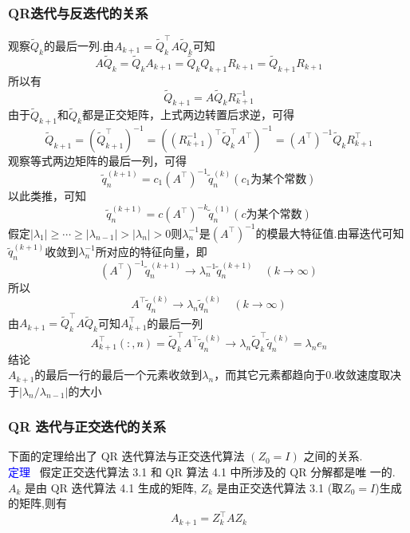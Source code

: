 \documentclass[12pt,a4paper]{article}
\begin{document}
	\subsubsection{QR迭代与反迭代的关系}
	观察$\tilde{Q}_{k}$的最后一列.由$A_{k+1}=\tilde{Q}_{k}^{\top} A \tilde{Q}_{k}$可知
	$$
	A \tilde{Q}_{k}=\tilde{Q}_{k} A_{k+1}=\tilde{Q}_{k} Q_{k+1} R_{k+1}=\tilde{Q}_{k+1} R_{k+1}
	$$
	所以有
	$$
	\tilde{Q}_{k+1}=A \tilde{Q}_{k} R_{k+1}^{-1}
	$$
	由于$\tilde{Q}_{k+1}$和$\tilde{Q}_{k}$都是正交矩阵，上式两边转置后求逆，可得
	$$
	\tilde{Q}_{k+1}=\left(\tilde{Q}_{k+1}^{\top}\right)^{-1}=\left(\left(R_{k+1}^{-1}\right)^{\top} \tilde{Q}_{k}^{\top} A^{\top}\right)^{-1}=\left(A^{\top}\right)^{-1} \tilde{Q}_{k} R_{k+1}^{\top}
	$$
	观察等式两边矩阵的最后一列，可得
	$$
	\tilde{q}_{n}^{(k+1)}=c_{1}\left(A^{\top}\right)^{-1} \tilde{q}_{n}^{(k)}(c_{1}\text{为某个常数})
	$$
	以此类推，可知
	$$
	\tilde{q}_{n}^{(k+1)}=c\left(A^{\top}\right)^{-k} \tilde{q}_{n}^{(1)}(c\text{为某个常数})
	$$
	假定$\left|\lambda_{1}\right| \geq \cdots \geq\left|\lambda_{n-1}\right|>\left|\lambda_{n}\right|>0$则$\lambda_{n}^{-1}$是$\left(A^{\top}\right)^{-1}$的模最大特征值.由幂迭代可知$\tilde{q}_{n}^{(k+1)}$收敛到$\lambda_{n}^{-1}$所对应的特征向量，即
	$$
	\left(A^{\top}\right)^{-1} \tilde{q}_{n}^{(k+1)} \rightarrow \lambda_{n}^{-1} \tilde{q}_{n}^{(k+1)} \quad(k \rightarrow \infty)
	$$
	所以
	$$
	A^{\top} \tilde{q}_{n}^{(k)} \rightarrow \lambda_{n} \tilde{q}_{n}^{(k)} \quad(k \rightarrow \infty)
	$$
	由$A_{k+1}=\tilde{Q}_{k}^{\top} A \tilde{Q}_{k}$可知$A_{k+1}^{\top}$的最后一列
	$$
	A_{k+1}^{\top}( :, n)=\tilde{Q}_{k}^{\top} A^{\top} \tilde{q}_{n}^{(k)} \rightarrow \lambda_{n} \tilde{Q}_{k}^{\top} \tilde{q}_{n}^{(k)}=\lambda_{n} e_{n}
	$$
	$\mathbf{结论}$\\
	$A_{k+1}$的最后一行的最后一个元素收敛到$\lambda_{n}$，而其它元素都趋向于0.收敛速度取决于$\left|\lambda_{n} / \lambda_{n-1}\right|$的大小
	\subsubsection{QR 迭代与正交迭代的关系}
	下面的定理给出了 QR 迭代算法与正交迭代算法 $(Z_{0} = I)$ 之间的关系.\\
	\textcolor{blue}{定理} ~假定正交迭代算法 3.1 和 QR 算法 4.1 中所涉及的 QR 分解都是唯 一的. $A_{k}$ 是由 QR 迭代算法 4.1 生成的矩阵, $Z_{k}$ 是由正交迭代算法 3.1 (取$Z_{0} =I$)生成的矩阵,则有
	$$
	A_{k+1}=Z_{k}^{\top} A Z_{k}
	$$
\end{document}
